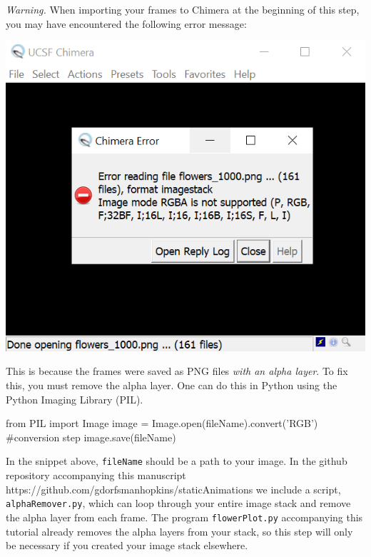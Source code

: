 \documentclass[12 pt]{article}
\begin{document}
\textit{Warning.} When importing your frames to Chimera at the beginning of this step, you may have encountered the following error message:
\begin{center}
  \includegraphics[width=.55\textwidth]{images/rgbaError.PNG}
\end{center}
This is because the frames were saved as PNG files \textit{with an alpha layer}.  To fix this, you must remove the alpha layer.  One can do this in Python using the Python Imaging Library (PIL).
\begin{python}
from PIL import Image
image = Image.open(fileName).convert('RGB') #conversion step
image.save(fileName)
\end{python}
In the snippet above, \verb|fileName| should be a path to your image.  In the github repository accompanying this manuscript https://github.com/gdorfsmanhopkins/staticAnimations we include a script, \verb|alphaRemover.py|, which can loop through your entire image stack and remove the alpha layer from each frame.  The program \verb|flowerPlot.py| accompanying this tutorial already removes the alpha layers from your stack, so this step will only be necessary if you created your image stack elsewhere.
\end{document}
